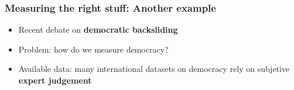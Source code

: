 \documentclass[aspectratio=43]{beamer}
\begin{document}
\begin{frame}
\frametitle{Measuring the right stuff: Another example}
\centering

\begin{itemize}
  \item Recent debate on \textbf{democratic backsliding}
  \item Problem: how do we measure democracy?
  \item Available data: many international datasets on democracy rely on subjetive \textbf{expert judgement}
\end{itemize}

\end{frame}







\end{document}

